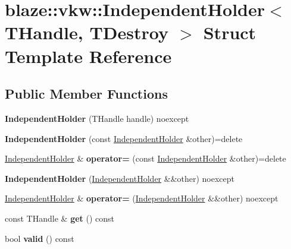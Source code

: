 \hypertarget{structblaze_1_1vkw_1_1IndependentHolder}{}\section{blaze\+:\+:vkw\+:\+:Independent\+Holder$<$ T\+Handle, T\+Destroy $>$ Struct Template Reference}
\label{structblaze_1_1vkw_1_1IndependentHolder}
\subsection*{Public Member Functions}
\begin{DoxyCompactItemize}
\item 
\mbox{\label{structblaze_1_1vkw_1_1IndependentHolder_a876f5147e798df3960ca007dfff9d652}} 
{\bfseries Independent\+Holder} (T\+Handle handle) noexcept
\item 
\mbox{\label{structblaze_1_1vkw_1_1IndependentHolder_a488662576f8f1cd2876a0e5a0e6bfc23}} 
{\bfseries Independent\+Holder} (const \hyperlink{structblaze_1_1vkw_1_1IndependentHolder}{Independent\+Holder} \&other)=delete
\item 
\mbox{\label{structblaze_1_1vkw_1_1IndependentHolder_a6af16a90c3e09e789d8aed0affcd9f6f}} 
\hyperlink{structblaze_1_1vkw_1_1IndependentHolder}{Independent\+Holder} \& {\bfseries operator=} (const \hyperlink{structblaze_1_1vkw_1_1IndependentHolder}{Independent\+Holder} \&other)=delete
\item 
\mbox{\label{structblaze_1_1vkw_1_1IndependentHolder_a59e55aaa32a01d6e349554fbd9f056b3}} 
{\bfseries Independent\+Holder} (\hyperlink{structblaze_1_1vkw_1_1IndependentHolder}{Independent\+Holder} \&\&other) noexcept
\item 
\mbox{\label{structblaze_1_1vkw_1_1IndependentHolder_a03234d4f0d5425df11f452a6d27da830}} 
\hyperlink{structblaze_1_1vkw_1_1IndependentHolder}{Independent\+Holder} \& {\bfseries operator=} (\hyperlink{structblaze_1_1vkw_1_1IndependentHolder}{Independent\+Holder} \&\&other) noexcept
\item 
\mbox{\label{structblaze_1_1vkw_1_1IndependentHolder_a3ffbf5070bdaf7014113b9301f1edfad}} 
const T\+Handle \& {\bfseries get} () const
\item 
\mbox{\label{structblaze_1_1vkw_1_1IndependentHolder_a0fa1ae49ecb290c2075e4060b3783a4c}} 
bool {\bfseries valid} () const
\end{DoxyCompactItemize}
